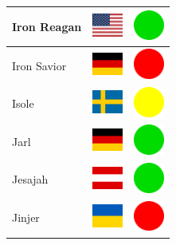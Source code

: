 \documentclass[12pt, a4paper, twoside]{report}
\begin{document}
\begin{center}
\begin{longtable}{|p{5cm}|p{2cm}|p{2cm}|}
Iron Reagan & \includegraphics[width=1cm]{4x3/us} & \includegraphics[width=1cm]{likes/y} \\ \hline
Iron Savior & \includegraphics[width=1cm]{4x3/de} & \includegraphics[width=1cm]{likes/n} \\ \hline
Isole & \includegraphics[width=1cm]{4x3/se} & \includegraphics[width=1cm]{likes/m} \\ \hline
Jarl & \includegraphics[width=1cm]{4x3/de} & \includegraphics[width=1cm]{likes/y} \\ \hline
Jesajah & \includegraphics[width=1cm]{4x3/at} & \includegraphics[width=1cm]{likes/y} \\ \hline
Jinjer & \includegraphics[width=1cm]{4x3/ua} & \includegraphics[width=1cm]{likes/n} \\ \hline

\end{longtable}
\end{center}
\end{document}
